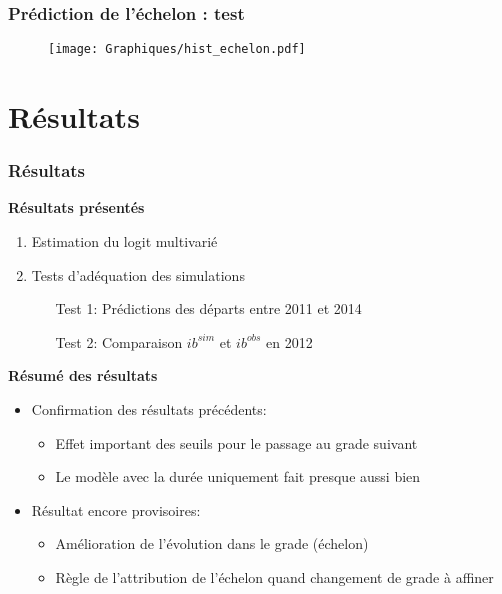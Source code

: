 \documentclass[xcolor=table,ignorenonframetext,12pt]{beamer}
\begin{document}
\begin{frame}
\frametitle{Prédiction de l'échelon : test}

\begin{figure}
	\vspace{-0.5cm}
	\texttt{[image: Graphiques/hist\_echelon.pdf]}
\end{figure}


\end{frame}



\section{Résultats}


\begin{frame}
\frametitle{Résultats}


\textbf{Résultats présentés}
\begin{enumerate}
\item Estimation du logit multivarié
\item Tests d'adéquation des simulations
\begin{enumerate}
\item[Test 1:] Prédictions des départs entre 2011 et 2014
\item[Test 2:] Comparaison $ib^{sim}$ et $ib^{obs}$ en 2012 
\end{enumerate} 
\end{enumerate}


\vspace{0.2cm}
\textbf{Résumé des résultats}
\begin{itemize}
\item Confirmation des résultats précédents:
\begin{itemize}
\item Effet important des seuils pour le passage au grade suivant
\item Le modèle avec la durée uniquement fait presque aussi bien 
\end{itemize}

\item Résultat encore provisoires:
\begin{itemize}
\item Amélioration de l'évolution dans le grade (échelon)
\item Règle de l'attribution de l'échelon quand changement de grade à affiner
\end{itemize}

\end{itemize}



\end{frame}
\end{document}
